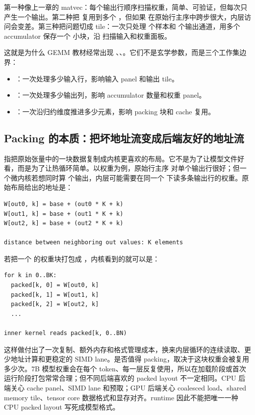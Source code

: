 第一种像上一章的 matvec：每个输出行顺序扫描权重，简单、可验证，但每次只产生一个输出。第二种把  复用到多个 ，但如果  在原始行主序中跨步很大，内层访问会变差。第三种把问题切成 tile：一次只处理  个样本和  个输出通道，用多个 accumulator 保存一个  小块，沿  扫描输入和权重面板。

这就是为什么 GEMM 教材经常出现 、、。它们不是玄学参数，而是三个工作集边界：

\begin{itemize}
  \item {}：一次处理多少输入行，影响输入 panel 和输出 tile。
  \item {}：一次处理多少输出列，影响 accumulator 数量和权重 panel。
  \item {}：一次沿归约维度推进多少元素，影响 packing 块和 cache 复用。
\end{itemize}

\subsection{Packing 的本质：把坏地址流变成后端友好的地址流}

 指把原始张量中的一块数据复制成内核更喜欢的布局。它不是为了让模型文件好看，而是为了让热循环简单。以权重为例，原始行主序  对单个输出行很好；但一个微内核若想同时算  个输出，内层可能需要在同一个  下读多条输出行的权重。原始布局给出的地址是：

\begin{lstlisting}[numbers=none,caption={原始权重在同一个 k 下访问多个 out}]
W[out0, k] = base + (out0 * K + k)
W[out1, k] = base + (out1 * K + k)
W[out2, k] = base + (out2 * K + k)

distance between neighboring out values: K elements
\end{lstlisting}

若把一个  的权重块打包成 ，内核看到的就可以是：

\begin{lstlisting}[numbers=none,caption={packed weight panel 的一种形状}]
for k in 0..BK:
  packed[k, 0] = W[out0, k]
  packed[k, 1] = W[out1, k]
  packed[k, 2] = W[out2, k]
  ...

inner kernel reads packed[k, 0..BN)
\end{lstlisting}

这样做付出了一次复制、额外内存和格式管理成本，换来内层循环的连续读取、更少地址计算和更稳定的 SIMD lane。是否值得 packing，取决于这块权重会被复用多少次。7B 模型权重会在每个 token、每一层反复使用，所以在加载阶段或首次运行阶段打包常常合理；但不同后端喜欢的 packed layout 不一定相同。CPU 后端关心 cache panel、SIMD lane 和预取；GPU 后端关心 coalesced load、shared memory tile、tensor core 数据格式和显存对齐。runtime 因此不能把唯一一种 CPU packed layout 写死成模型格式。

